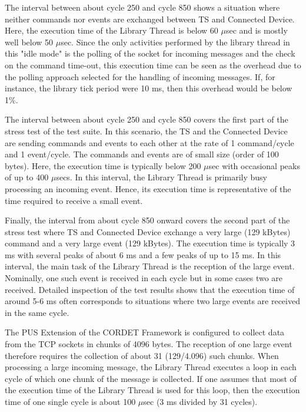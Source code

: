 \documentclass{pnp_article}
\begin{document}
{The interval between about cycle 250 and cycle 850 shows a situation where neither commands nor events are exchanged between TS and Connected Device. Here, the execution time of the Library Thread is below 60 $\mu$sec and is mostly well below 50 $\mu$sec. Since the only activities performed by the library thread in this "idle mode" is the polling of the socket for incoming messages and the check on the command time-out, this execution time can be seen as the overhead due to the polling approach selected for the handling of incoming messages. If, for instance, the library tick period were 10 ms, then this overhead would be below 1\%.

The interval between about cycle 250 and cycle 850 covers the first part of the stress test of the test suite. In this scenario, the TS and the Connected Device are sending commands and events to each other at the rate of 1 command/cycle and 1 event/cycle. The commands and events are of small size (order of 100 bytes). Here, the execution time is typically below 200 $\mu$sec with occasional peaks of up to 400 $\mu$secs. In this interval, the Library Thread is primarily busy processing an incoming event. Hence, its execution time is representative of the time required to receive a small event. 

Finally, the interval from about cycle 850 onward covers the second part of the stress test where TS and Connected Device exchange a very large (129 kBytes) command and a very large event (129 kBytes). The execution time is typically 3 ms with several peaks of about 6 ms and a few peaks of up to 15 ms. In this interval, the main task of the Library Thread is the reception of the large event. Nominally, one such event is received in each cycle but in some cases two are received. Detailed inspection of the test results shows that the execution time of around 5-6 ms often corresponds to situations where two large events are received in the same cycle.

The PUS Extension of the CORDET Framework is configured to collect data from the TCP sockets in chunks of 4096 bytes. The reception of one large event therefore requires the collection of about 31 (129/4.096) such chunks. When processing a large incoming message, the Library Thread executes a loop in each cycle of which one chunk of the message is collected. If one assumes that most of the execution time of the Library Thread is used for this loop, then the execution time of one single cycle is about 100 $\mu$sec (3 ms divided by 31 cycles).

}
\end{document}
